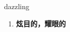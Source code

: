 
\begin{frame}
{\huge dazzling}
\begin{center}
\begin{enumerate}\Large
  \item \textbf{炫目的，耀眼的}
\end{enumerate}
\end{center}
\end{frame}
